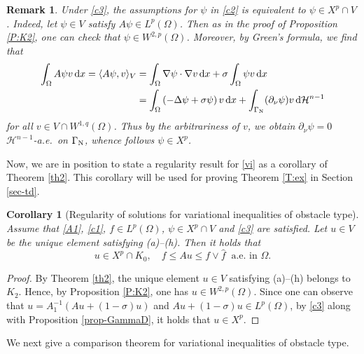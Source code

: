 \documentclass[reqno,10pt]{amsart}
\newtheorem{Cor}[Th]{Corollary}
\newtheorem{Rem}[Th]{Remark}
\begin{document}
\begin{Rem}
{\rm
Under \eqref{c3}, the assumptions for $\psi$ in \eqref{c2} is equivalent
 to $\psi \in X^p \cap V$. Indeed, let $\psi \in V$ satisfy $A\psi
 \in L^p(\Omega)$. Then as in the proof of Proposition \ref{P:K2}, one
 can check that $\psi \in W^{2,p}(\Omega)$. Moreover, by Green's
 formula, we find that
\begin{align*}
\int_\Omega A \psi v \, {\text{\rm d}} x
=
\langle A\psi, v \rangle_V 
&= \int_\Omega \nabla \psi \cdot \nabla v \, {\text{\rm d}} x + \sigma \int_\Omega
 \psi v \, {\text{\rm d}} x\\
&= \int_\Omega \left( - \Delta \psi + \sigma \psi \right) v \, {\text{\rm d}} x 
+ \int_{{\Gamma_{\rm\scriptsize N}}} (\partial_\nu \psi) v \, {\text{\rm d}} {{\mathcal H}}^{n-1}
\end{align*}
for all $v \in V \cap W^{1,q}(\Omega)$. Thus by the
 arbitrariness of $v$, we obtain $\partial_\nu \psi = 0$ \ ${{\mathcal H}}^{n-1}$-a.e.~on ${{\Gamma_{\rm\scriptsize N}}}$,
 whence follows $\psi \in X^p$.
}
\end{Rem}

Now, we are in position to state a regularity result for \eqref{vi} as a
corollary of Theorem \ref{th2}. This corollary will be used for proving
Theorem \ref{T:ex} in Section \ref{sec-td}.

\begin{Cor}[Regularity of solutions for variational inequalities of
 obstacle type]\label{cor1}
Assume that \eqref{A1}, \eqref{c1}, $f \in L^p(\Omega)$, $\psi \in X^p
 \cap V$ and \eqref{c3} are satisfied.
Let $u \in V$ be the unique element satisfying {\rm (a)--(h)}. Then it
 holds that
\begin{equation}\label{3}
u\in X^p \cap K_0, 
\quad
f \leq Au \leq f \vee \hat f \ \mbox{ a.e.~in } \Omega.
\end{equation}
\end{Cor}

\begin{proof}
By Theorem \ref{th2}, the unique element $u \in V$ satisfying (a)--(h)
 belongs to $K_2$. Hence, by Proposition \ref{P:K2}, one has $u
 \in W^{2,p}(\Omega)$. Since one can observe that $u = A_1^{-1}(Au + (1 -
 \sigma) u)$ and $Au + (1 - \sigma) u \in L^p(\Omega)$, by \eqref{c3}
 along with Proposition \ref{prop-GammaD}, it holds that $u \in X^p$. 
\end{proof} 

We next give a comparison theorem for variational inequalities of
obstacle type.
\end{document}
